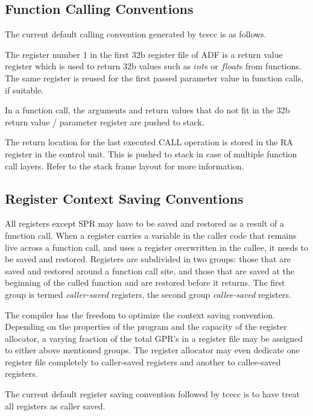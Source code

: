 \documentclass[twoside]{tceusermanual}
\begin{document}
\subsection{Function Calling Conventions}
\label{ssec:calling-conventions}

The current default calling convention generated by tcecc is as follows.

The register number 1 in the first 32b register file of ADF 
is a return value register which is used to return 
32b values such as $int$s or $float$s from functions. 
The same register is reused for the first 
passed parameter value in function calls, if suitable. 

In a function call, the arguments and return values that do not fit 
in the 32b return value / parameter register are pushed to stack.

The return location for the last executed CALL operation is 
stored in the RA register in the control unit. This is pushed 
to stack in case of multiple function call layers. Refer to the 
stack frame layout for more information.


\subsection{Register Context Saving Conventions}
\label{ssec:register-conventions}

All registers except SPR may have to be saved and restored as a result of a
function call.  When a register carries a variable in the caller code that
remains live across a function call, and uses a register overwritten in the callee, 
it needs to be saved and restored.  Registers are subdivided in two groups:
those that are saved and restored around a function call site, and those that are
saved at the beginning of the called function and are restored before it 
returns. The first group is termed \textit{caller-saved} registers, the second 
group \textit{callee-saved} registers.

The compiler has the freedom to optimize the context saving convention.
Depending on the properties of the program and the capacity of the register
allocator, a varying fraction of the total GPR's in a register file may be
assigned to either above mentioned groups.  The register allocator may even 
dedicate one register file completely to caller-saved registers and another 
to callee-saved registers.

The current default register saving convention followed by tcecc is to have 
treat all registers as caller saved. 
\end{document}
